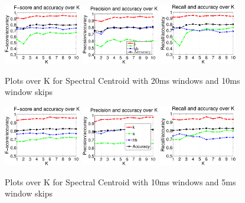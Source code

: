 \begin{figure}


	\centering\includegraphics[width=0.3\textwidth]{scentroid2010FP.png}
	\centering\includegraphics[width=0.3\textwidth]{scentroid2010_P.png}
	\centering\includegraphics[width=0.3\textwidth]{scentroid2010_R.png}
	
	\caption{Plots over K for Spectral Centroid with 20ms windows and 10ms window skips}
\end{figure}
\begin{figure}


	\centering\includegraphics[width=0.3\textwidth]{scentroid105FP.png}
	\centering\includegraphics[width=0.3\textwidth]{scentroid105_P.png}
	\centering\includegraphics[width=0.3\textwidth]{scentroid105_R.png}
		
		\caption{Plots over K for Spectral Centroid with 10ms windows and 5ms window skips}
\end{figure}
